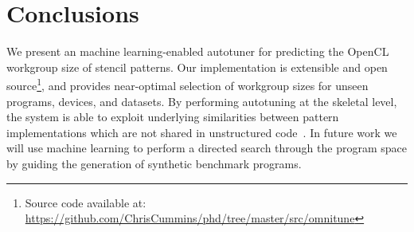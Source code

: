\documentclass[hidelinks]{acaces}
\begin{document}
\section{Conclusions}

We present an machine learning-enabled autotuner for predicting the
OpenCL workgroup size of stencil patterns. Our implementation is
extensible and open source\footnote{Source code available at:
  \url{https://github.com/ChrisCummins/phd/tree/master/src/omnitune}},
and provides near-optimal selection of workgroup sizes for unseen
programs, devices, and datasets. By performing autotuning at the
skeletal level, the system is able to exploit underlying similarities
between pattern implementations which are not shared in unstructured
code~\cite{Hu2015}. In future work we will use machine learning to
perform a directed search through the program space by guiding the
generation of synthetic benchmark programs.


\label{bibliography}

\begingroup
{}
\setlength\bibitemsep{1pt}
\printbibliography
\endgroup
\end{document}
